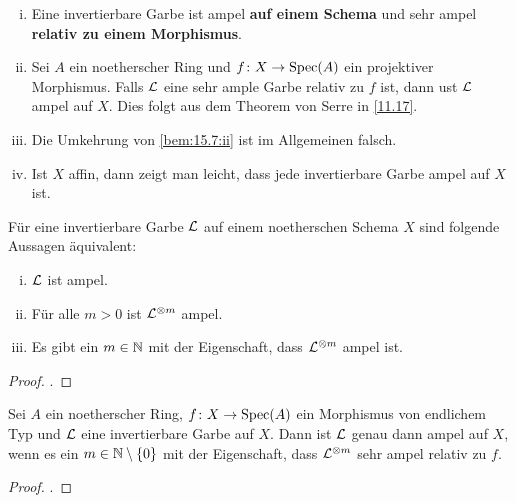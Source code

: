 \begin{bem}
\label{bem:15.7}
	\begin{enumerate}[i)]
		\item\label{bem:15.7:i} Eine invertierbare Garbe ist ampel \textbf{auf einem Schema} und sehr ampel \textbf{relativ zu einem Morphismus}.
		\item\label{bem:15.7:ii} Sei $A$ ein noetherscher Ring und $f\colon X \to \operatorname{Spec}(A)$ ein projektiver Morphismus. Falls $\mathcal{L}$ eine sehr ample Garbe relativ zu $f$ ist, dann ust $\mathcal{L}$ ampel auf $X$. Dies folgt aus dem Theorem von Serre in \ref{11.17}.
		\item\label{bem:15.7:iii} Die Umkehrung von \ref{bem:15.7:ii} ist im Allgemeinen falsch.
		\item\label{bem:15.7:iv} Ist $X$ affin, dann zeigt man leicht, dass jede invertierbare Garbe ampel auf $X$ ist.
	\end{enumerate}
\end{bem}

\begin{prop}
\label{prop:15.8}
	Für eine invertierbare Garbe $\mathcal{L}$ auf einem noetherschen Schema $X$ sind folgende Aussagen äquivalent:
	\begin{enumerate}[i)]
		\item $\mathcal{L}$ ist ampel.
		\item Für alle $m > 0$ ist $\mathcal{L}^{\otimes m}$ ampel.
		\item Es gibt ein $m \in \mathbb {N}$ mit der Eigenschaft, dass $\mathcal{L}^{\otimes m}$ ampel ist.
	\end{enumerate}
	\begin{proof}
		\cite[Proposition~II.7.5]{hartshorne1977algebraic}.
	\end{proof}
\end{prop}

\begin{thm}
\label{thm:15.9}
	Sei $A$ ein noetherscher Ring, $f \colon X \to \operatorname{Spec}(A)$ ein Morphismus von endlichem Typ und $\mathcal{L}$ eine invertierbare Garbe auf $X$. Dann ist $\mathcal{L}$ genau dann ampel auf $X$, wenn es ein $m \in \mathbb {N} \setminus \{0\}$ mit der Eigenschaft, dass $\mathcal{L}^{\otimes m}$ sehr ampel relativ zu $f$.
	\begin{proof}
		\cite[Theorem~II.7.6]{hartshorne1977algebraic}.
	\end{proof}
\end{thm}

